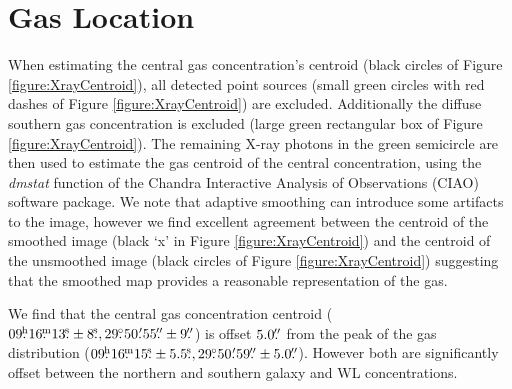 \section{Gas Location}\label{section:GasLocation}

When estimating the central gas concentration's centroid (black circles of Figure \ref{figure:XrayCentroid}), all detected point sources (small green circles with red dashes of Figure \ref{figure:XrayCentroid}) are excluded.
Additionally the diffuse southern gas concentration is excluded (large green rectangular box of Figure \ref{figure:XrayCentroid}).
The remaining X-ray photons in the green semicircle are then used to estimate the gas centroid of the central concentration, using  the \textit{dmstat} function of the Chandra Interactive Analysis of Observations (CIAO) software package.
We note that adaptive smoothing can introduce some artifacts to the image, however we find excellent agreement between the centroid of the smoothed image (black `x' in Figure \ref{figure:XrayCentroid}) and the centroid of the unsmoothed image (black circles of Figure \ref{figure:XrayCentroid}) suggesting that the smoothed map provides a reasonable representation of the gas.

We find that the central gas concentration centroid ($09\fh16\fm13\fs\pm8\fs, 29\fdg50\farcm55\farcs\pm9\farcs$) is offset $5.0\mbox{$.\!\!^{\prime\prime}$}$ from the peak of the gas distribution ($09\fh16\fm15\fs\pm5.5\fs, 29\fdg50\farcm59\farcs\pm5.0\farcs$).
However both are significantly offset between the northern and southern galaxy and WL concentrations.

